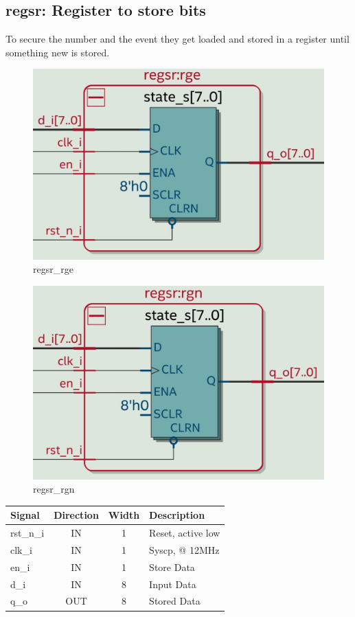 \documentclass[12pt,a4 paper] {report}
\begin{document}
\subsection{regsr: Register to store bits}
To secure the number and the event they get loaded and stored in a register until something new is stored.
\begin{figure}[h]
	\centering	
	\includegraphics[scale=0.12]{../png/regsr_rge.png}
	\caption{regsr\_rge}
\end{figure}
\begin{figure}[h]
	\centering	
	\includegraphics[scale=0.12]{../png/regsr_rgn.png}
	\caption{regsr\_rgn}
\end{figure}
\begin{center}
	\begin{tabular}{ | p{2cm} | c | c | p{5cm} |}
		\hline
		\textbf{Signal} & \textbf{Direction} & \textbf{Width} & \textbf{Description} \\
		\hline	
 		rst\_n\_i & IN & 1 & Reset, active low \\
 		\hline
		clk\_i & IN & 1 & Syscp, @ 12MHz \\
		\hline
		en\_i & IN & 1 & Store Data \\
		\hline
		d\_i & IN & 8 & Input Data \\
		\hline
		q\_o & OUT & 8 & Stored Data \\
		\hline
	\end{tabular}
\end{center}
\end{document}
